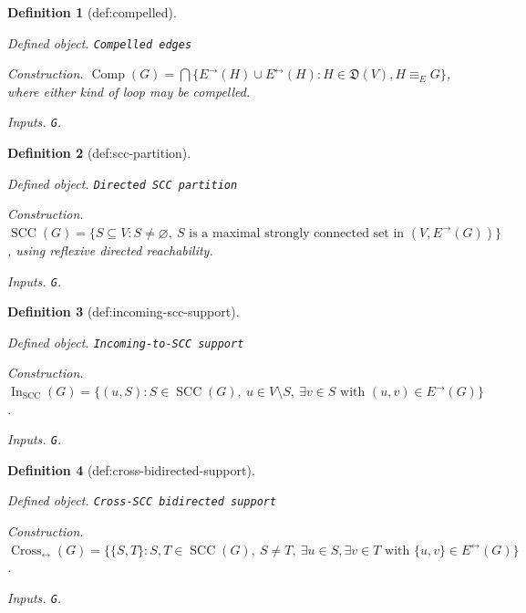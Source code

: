 \documentclass{article}
\newtheorem{definition}{Definition}
\begin{document}
\begin{definition}[def:compelled]\label{def:compelled}
\par\smallskip\noindent\emph{Defined object.} \texttt{Compelled edges}
\par\smallskip\noindent\emph{Construction.} \(\operatorname{Comp}(G)=\bigcap\{E^{\to}(H)\cup E^{\leftrightarrow}(H):H\in\mathfrak D(V),H\equiv_E G\}\), where either kind of loop may be compelled.
\par\smallskip\noindent\emph{Inputs.} \texttt{G}.
\end{definition}

\begin{definition}[def:scc-partition]\label{def:scc-partition}
\par\smallskip\noindent\emph{Defined object.} \texttt{Directed SCC partition}
\par\smallskip\noindent\emph{Construction.} \(\operatorname{SCC}(G)=\{S\subseteq V:S\neq\varnothing,\ S\text{ is a maximal strongly connected set in }(V,E^{\to}(G))\}\), using reflexive directed reachability.
\par\smallskip\noindent\emph{Inputs.} \texttt{G}.
\end{definition}

\begin{definition}[def:incoming-scc-support]\label{def:incoming-scc-support}
\par\smallskip\noindent\emph{Defined object.} \texttt{Incoming-\allowbreak{}to-\allowbreak{}SCC support}
\par\smallskip\noindent\emph{Construction.} \(\operatorname{In}_{\mathrm{SCC}}(G)=\{(u,S):S\in\operatorname{SCC}(G),\ u\in V\setminus S,\ \exists v\in S\text{ with }(u,v)\in E^{\to}(G)\}\).
\par\smallskip\noindent\emph{Inputs.} \texttt{G}.
\end{definition}

\begin{definition}[def:cross-bidirected-support]\label{def:cross-bidirected-support}
\par\smallskip\noindent\emph{Defined object.} \texttt{Cross-\allowbreak{}SCC bidirected support}
\par\smallskip\noindent\emph{Construction.} \(\operatorname{Cross}_{\leftrightarrow}(G)=\{\{S,T\}:S,T\in\operatorname{SCC}(G),\ S\neq T,\ \exists u\in S,\exists v\in T\text{ with }\{u,v\}\in E^{\leftrightarrow}(G)\}\).
\par\smallskip\noindent\emph{Inputs.} \texttt{G}.
\end{definition}
\end{document}
